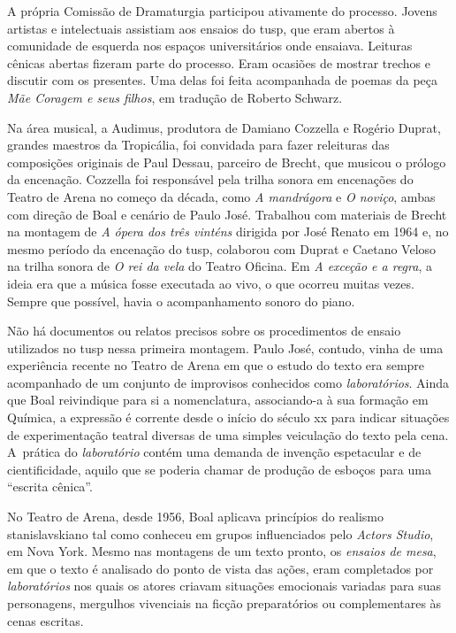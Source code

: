 A própria Comissão de Dramaturgia participou ativamente do processo.
Jovens artistas e intelectuais assistiam aos ensaios do {\sc tusp}, que eram
abertos à comunidade de esquerda nos espaços universitários onde
ensaiava. Leituras cênicas abertas fizeram parte do processo. Eram
ocasiões de mostrar trechos e discutir com os presentes. Uma delas foi
feita acompanhada de poemas da peça {\it Mãe Coragem e seus filhos}, em
tradução de Roberto Schwarz.

Na área musical, a Audimus, produtora de Damiano Cozzella e Rogério
Duprat, grandes maestros da Tropicália, foi convidada para fazer
releituras das composições originais de Paul Dessau, parceiro de Brecht,
que musicou o prólogo da encenação. Cozzella foi responsável pela trilha
sonora em encenações do Teatro de Arena no começo da década, como {\it A
mandrágora} e {\it O noviço}, ambas com direção de Boal e cenário de
Paulo José. Trabalhou com materiais de Brecht na montagem de {\it A
ópera dos três vinténs} dirigida por José Renato em 1964 e, no mesmo
período da encenação do {\sc tusp}, colaborou com Duprat e Caetano Veloso na
trilha sonora de {\it O rei da vela} do Teatro Oficina. Em {\it A
exceção e a regra}, a ideia era que a música fosse executada ao vivo, o que
ocorreu muitas vezes. Sempre que possível, havia o acompanhamento
sonoro do piano.

\subject{Ensaios e laboratórios}

Não há documentos ou relatos precisos sobre os procedimentos de ensaio
utilizados no {\sc tusp} nessa primeira montagem. Paulo José, contudo, vinha
de uma experiência recente no Teatro de Arena em que o estudo do texto
era sempre acompanhado de um conjunto de improvisos conhecidos como
{\it laboratórios}. Ainda que Boal reivindique para si a
nomenclatura, associando-a à sua formação em Química, a expressão é
corrente desde o início do século {\sc xx} para indicar situações de
experimentação teatral diversas de uma simples veiculação do texto pela
cena. A~prática do {\it laboratório} contém uma demanda de invenção
espetacular e de cientificidade, aquilo que se poderia chamar de produção
de esboços para uma “escrita cênica”.

No Teatro de Arena, desde 1956, Boal aplicava princípios do realismo
stanislavskiano tal como conheceu em grupos influenciados pelo
{\it Actors Studio}, em Nova York. Mesmo nas montagens de um texto
pronto, os {\it ensaios de mesa}, em que o texto é analisado do
ponto de vista das ações, eram completados por {\it laboratórios} nos quais
os atores criavam situações emocionais variadas para suas personagens,
mergulhos vivenciais na ficção preparatórios ou complementares às cenas
escritas.

